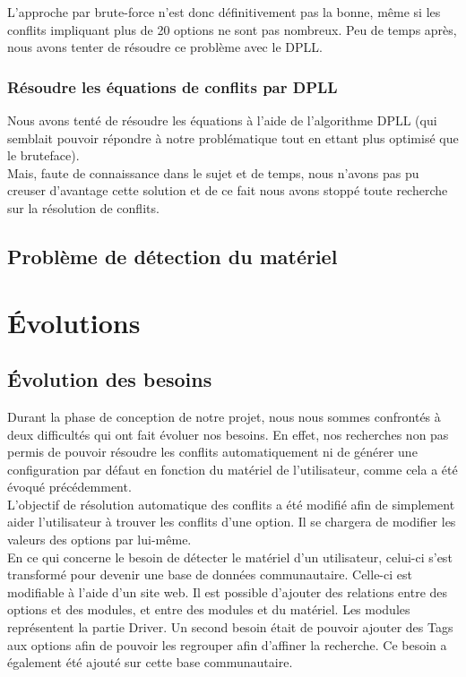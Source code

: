 \documentclass[17pts]{report}
\begin{document}
L'approche par brute-force n'est donc définitivement pas la bonne, même si les
conflits impliquant plus de 20 options ne sont pas nombreux.
Peu de temps après, nous avons tenter de résoudre ce problème avec le DPLL.\\

\subsubsection{Résoudre les équations de conflits par DPLL}
\label{ssub:Résoudre les équations de conflits par DPLL}

Nous avons tenté de résoudre les équations à l'aide de l'algorithme DPLL (qui
semblait pouvoir répondre à notre problématique tout en ettant plus optimisé
que le bruteface).\\
Mais, faute de connaissance dans le sujet et de temps, nous n'avons pas pu
creuser d'avantage cette solution et de ce fait nous avons stoppé toute
recherche sur la résolution de conflits.\\

\subsection{Problème de détection du matériel}
\label{sub:Problème de détection du matériel}

\section{Évolutions}
\label{sec:Évolutions}
\subsection{Évolution des besoins}
\label{sub:Évolution des besoins}

Durant la phase de conception de notre projet, nous nous sommes confrontés à
deux difficultés qui ont fait évoluer nos besoins. En effet, nos recherches non
pas permis de pouvoir résoudre les conflits automatiquement ni de générer une
configuration par défaut en fonction du matériel de l'utilisateur, comme cela a
été évoqué précédemment.  \\

L'objectif de résolution automatique des conflits a été modifié afin de
simplement aider l'utilisateur à trouver les conflits d'une option. Il se
chargera de modifier les valeurs des options par lui-même.  \\

En ce qui concerne le besoin de détecter le matériel d'un utilisateur, celui-ci
s'est transformé pour devenir une base de données communautaire. Celle-ci est
modifiable à l'aide d'un site web. Il est possible d'ajouter des relations
entre des options et des modules, et entre des modules et du matériel. Les
modules représentent la partie Driver. Un second besoin était de pouvoir
ajouter des Tags aux options afin de pouvoir les regrouper afin d'affiner la
recherche. Ce besoin a également été ajouté sur cette base communautaire.
\end{document}
